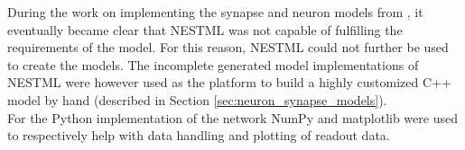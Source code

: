 During the work on implementing the synapse and neuron models from \parencite{klampfl_maass_2013}, it eventually became clear that NESTML was not capable of fulfilling the requirements of the model. For this reason, NESTML could not further be used to create the models. The incomplete generated model implementations of NESTML were however used as the platform to build a highly customized C++ model by hand (described in Section \ref{sec:neuron_synapse_models}).\\
For the Python implementation of the network NumPy and matplotlib were used to respectively help with data handling and plotting of readout data. 

